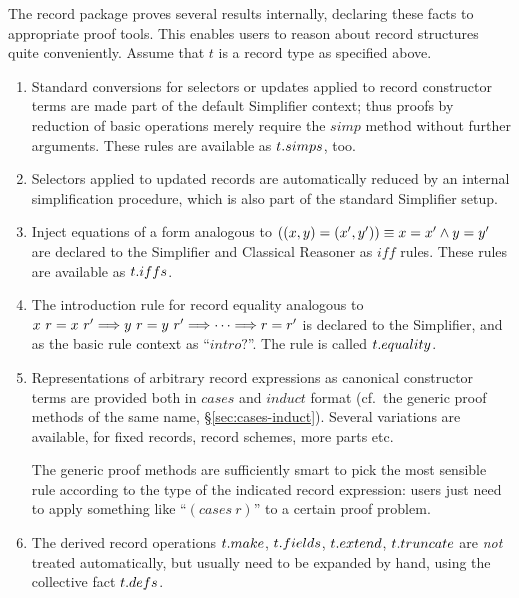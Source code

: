 The record package proves several results internally, declaring these facts to
appropriate proof tools.  This enables users to reason about record structures
quite conveniently.  Assume that $t$ is a record type as specified above.

\begin{enumerate}
  
\item Standard conversions for selectors or updates applied to record
  constructor terms are made part of the default Simplifier context; thus
  proofs by reduction of basic operations merely require the $simp$ method
  without further arguments.  These rules are available as $t{\mathord.}simps$,
  too.
  
\item Selectors applied to updated records are automatically reduced by an
  internal simplification procedure, which is also part of the standard
  Simplifier setup.

\item Inject equations of a form analogous to $((x, y) = (x', y')) \equiv x=x'
  \wedge y=y'$ are declared to the Simplifier and Classical Reasoner as $iff$
  rules.  These rules are available as $t{\mathord.}iffs$.

\item The introduction rule for record equality analogous to $x~r = x~r' \Longrightarrow
  y~r = y~r' \Longrightarrow \dots \Longrightarrow r = r'$ is declared to the Simplifier, and as the
  basic rule context as ``$intro?$''.  The rule is called $t{\mathord.}equality$.

\item Representations of arbitrary record expressions as canonical constructor
  terms are provided both in $cases$ and $induct$ format (cf.\ the generic
  proof methods of the same name, \S\ref{sec:cases-induct}).  Several
  variations are available, for fixed records, record schemes, more parts etc.
  
  The generic proof methods are sufficiently smart to pick the most sensible
  rule according to the type of the indicated record expression: users just
  need to apply something like ``$(cases~r)$'' to a certain proof problem.

\item The derived record operations $t{\mathord.}make$, $t{\mathord.}fields$,
  $t{\mathord.}extend$, $t{\mathord.}truncate$ are \emph{not} treated automatically, but
  usually need to be expanded by hand, using the collective fact
  $t{\mathord.}defs$.

\end{enumerate}


